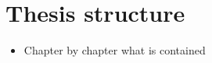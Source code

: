 \chapter{Thesis structure}
\label{chap:Structure}

\begin{itemize}
\item Chapter by chapter what is contained
\end {itemize}
